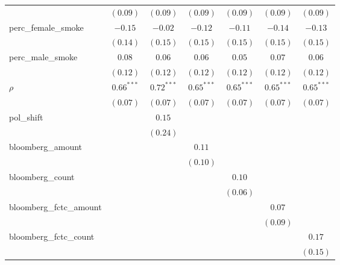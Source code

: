 \begin{table}[!h]
\begin{center}
\begin{tabular}{l c c c c c c }
                        & $(0.09)$     & $(0.09)$     & $(0.09)$     & $(0.09)$     & $(0.09)$     & $(0.09)$     \\
perc\_female\_smoke     & $-0.15$      & $-0.02$      & $-0.12$      & $-0.11$      & $-0.14$      & $-0.13$      \\
                        & $(0.14)$     & $(0.15)$     & $(0.15)$     & $(0.15)$     & $(0.15)$     & $(0.15)$     \\
perc\_male\_smoke       & $0.08$       & $0.06$       & $0.06$       & $0.05$       & $0.07$       & $0.06$       \\
                        & $(0.12)$     & $(0.12)$     & $(0.12)$     & $(0.12)$     & $(0.12)$     & $(0.12)$     \\
$\rho$                  & $0.66^{***}$ & $0.72^{***}$ & $0.65^{***}$ & $0.65^{***}$ & $0.65^{***}$ & $0.65^{***}$ \\
                        & $(0.07)$     & $(0.07)$     & $(0.07)$     & $(0.07)$     & $(0.07)$     & $(0.07)$     \\
pol\_shift              &              & $0.15$       &              &              &              &              \\
                        &              & $(0.24)$     &              &              &              &              \\
bloomberg\_amount       &              &              & $0.11$       &              &              &              \\
                        &              &              & $(0.10)$     &              &              &              \\
bloomberg\_count        &              &              &              & $0.10$       &              &              \\
                        &              &              &              & $(0.06)$     &              &              \\
bloomberg\_fctc\_amount &              &              &              &              & $0.07$       &              \\
                        &              &              &              &              & $(0.09)$     &              \\
bloomberg\_fctc\_count  &              &              &              &              &              & $0.17$       \\
                        &              &              &              &              &              & $(0.15)$     \\

\end{tabular}
\end{center}
\end{table}
